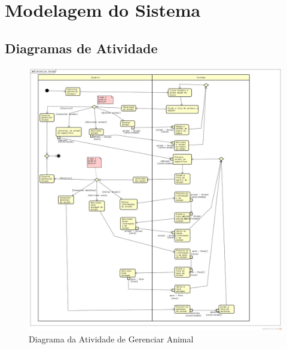 \documentclass[12pt]{article}
\begin{document}
\begin{titlepage}
\begin{figure}[!h]
\begin{center}

\end{center}
\end{figure}


\newpage
\section{Modelagem do Sistema}

\subsection{Diagramas de Atividade}

\begin{figure}[!h]
\begin{center}
\caption{Diagrama da Atividade de Gerenciar Animal}
\includegraphics[width=6in]{img/atividadeanimal.png}

\end{center}
\end{figure}

\newpage


\end{titlepage}
\end{document}
